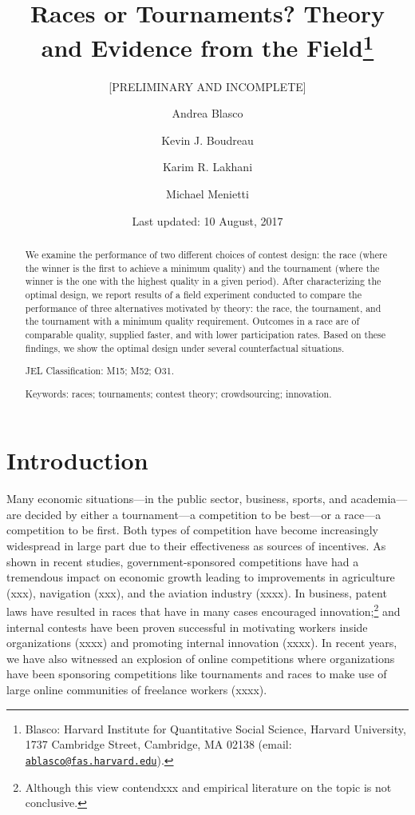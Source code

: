 \documentclass[10pt, titlepage]{article}
\title{Races or Tournaments? Theory and Evidence from the Field\thanks{Blasco: Harvard Institute for Quantitative Social Science, Harvard
University, 1737 Cambridge Street, Cambridge, MA 02138 (email:
\href{mailto:ablasco@fas.harvard.edu}{\nolinkurl{ablasco@fas.harvard.edu}}).}}
\subtitle{{[}PRELIMINARY AND INCOMPLETE{]}}
\author{Andrea Blasco \and Kevin J. Boudreau \and Karim R. Lakhani \and Michael Menietti}
\date{Last updated: 10 August, 2017}
\begin{document}
\maketitle
\begin{abstract}
We examine the performance of two different choices of contest design:
the race (where the winner is the first to achieve a minimum quality)
and the tournament (where the winner is the one with the highest quality
in a given period). After characterizing the optimal design, we report
results of a field experiment conducted to compare the performance of
three alternatives motivated by theory: the race, the tournament, and
the tournament with a minimum quality requirement. Outcomes in a race
are of comparable quality, supplied faster, and with lower participation
rates. Based on these findings, we show the optimal design under several
counterfactual situations.

\smallskip\noindent 
JEL Classification: M15; M52; O31.

\smallskip\noindent 
Keywords: races; tournaments; contest theory; crowdsourcing; innovation.
\end{abstract}


\clearpage

\section{Introduction}\label{introduction}

Many economic situations---in the public sector, business, sports, and
academia---are decided by either a tournament---a competition to be
best---or a race---a competition to be first. Both types of competition
have become increasingly widespread in large part due to their
effectiveness as sources of incentives. As shown in recent studies,
government-sponsored competitions have had a tremendous impact on
economic growth leading to improvements in agriculture (xxx), navigation
(xxx), and the aviation industry (xxxx). In business, patent laws have
resulted in races that have in many cases encouraged
innovation;\footnote{Although this view contendxxx and empirical
  literature on the topic is not conclusive.} and internal contests have
been proven successful in motivating workers inside organizations (xxxx)
and promoting internal innovation (xxxx). In recent years, we have also
witnessed an explosion of online competitions where organizations have
been sponsoring competitions like tournaments and races to make use of
large online communities of freelance workers (xxxx).
\end{document}
